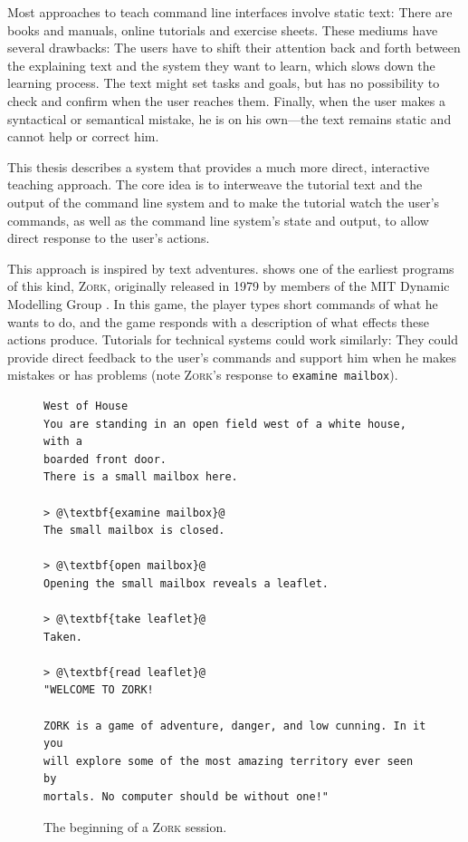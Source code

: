 \documentclass[paper=a4,twoside,abstract=on,cleardoublepage=empty,numbers=noenddot,toc=bib,toc=listof,12pt,appendixprefix=true]{scrreprt}
\begin{document}
Most approaches to teach command line interfaces involve static text: There are books and manuals, online tutorials and exercise sheets. These mediums have several drawbacks: The users have to shift their attention back and forth between the explaining text and the system they want to learn, which slows down the learning process. The text might set tasks and goals, but has no possibility to check and confirm when the user reaches them. Finally, when the user makes a syntactical or semantical mistake, he is on his own---the text remains static and cannot help or correct him.

This thesis describes a system that provides a much more direct, interactive teaching approach. The core idea is to interweave the tutorial text and the output of the command line system and to make the tutorial watch the user's commands, as well as the command line system's state and output, to allow direct response to the user's actions.

This approach is inspired by text adventures.  shows one of the earliest programs of this kind, \textsc{Zork}, originally released in 1979 by members of the MIT Dynamic Modelling Group \cite{infocom}. In this game, the player types short commands of what he wants to do, and the game responds with a description of what effects these actions produce. Tutorials for technical systems could work similarly: They could provide direct feedback to the user's commands and support him when he makes mistakes or has problems (note \textsc{Zork}'s response to \texttt{examine mailbox}).

\begin{figure}[tb]
    \begin{lstlisting}[escapechar=@,frame=shadowbox]
West of House
You are standing in an open field west of a white house, with a
boarded front door.
There is a small mailbox here.

> @\textbf{examine mailbox}@
The small mailbox is closed.

> @\textbf{open mailbox}@
Opening the small mailbox reveals a leaflet.

> @\textbf{take leaflet}@
Taken.

> @\textbf{read leaflet}@
"WELCOME TO ZORK!

ZORK is a game of adventure, danger, and low cunning. In it you
will explore some of the most amazing territory ever seen by
mortals. No computer should be without one!"
    \end{lstlisting}
    \centering
    \caption{The beginning of a \textsc{Zork} session.}
    \label{fig:zork}
\end{figure}
\end{document}
